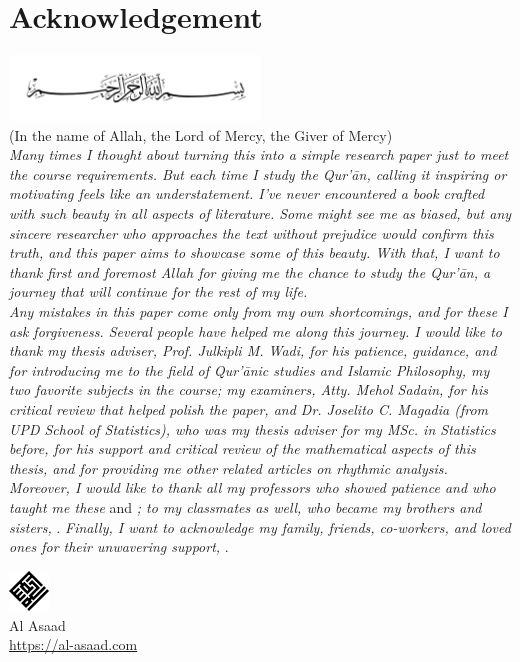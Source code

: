 \chapter*{Acknowledgement}
{\centering
\includegraphics[width=0.5\textwidth]{img/bismillah.jpg}\\[-.2cm]
(In the name of Allah, the Lord of Mercy, the Giver of Mercy)\\[0.6cm]
}\textit{Many times I thought about turning this into a simple research paper just to meet the course requirements. But each time I study the Qur'\=an, calling it inspiring or motivating feels like an understatement. I've never encountered a book crafted with such beauty in all aspects of literature. Some might see me as biased, but any sincere researcher who approaches the text without prejudice would confirm this truth, and this paper aims to showcase some of this beauty. With that, I want to thank first and foremost Allah \textrm{} for giving me the chance to study the Qur'\=an, a journey that will continue for the rest of my life.}\\[0.3cm]
\indent\textit{Any mistakes in this paper come only from my own shortcomings, and for these I ask forgiveness. Several people have helped me along this journey. I would like to thank my thesis adviser, Prof. Julkipli M. Wadi, for his patience, guidance, and for introducing me to the field of Qur'\=anic studies and Islamic Philosophy, my two favorite subjects in the course; my examiners, Atty. Mehol Sadain, for his critical review that helped polish the paper, and Dr. Joselito C. Magadia (from UPD School of Statistics), who was my thesis adviser for my MSc. in Statistics before, for his support and critical review of the mathematical aspects of this thesis, and for providing me other related articles on rhythmic analysis. Moreover, I would like to thank all my professors who showed patience and who taught me these}  and \textit{; to my classmates as well, who became my brothers and sisters,} . \textit{Finally, I want to acknowledge my family, friends, co-workers, and loved ones for their unwavering support,} .\\
\begin{center}
    \includegraphics[width=0.08\textwidth]{img/alasaad-logo.png}\\
    Al Asaad\\
    \url{https://al-asaad.com}\\[-0.5cm]
\end{center}
